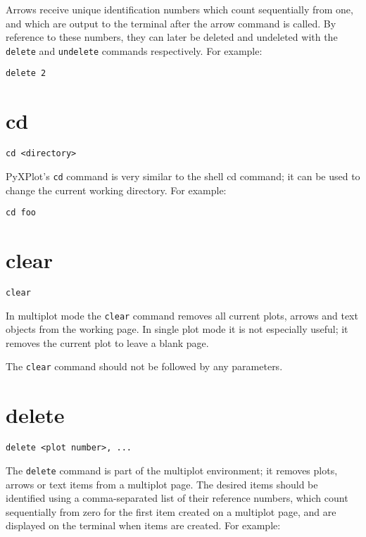 Arrows receive unique identification numbers which count sequentially from one,
and which are output to the terminal after the arrow command is called. By
reference to these numbers, they can later be deleted and undeleted with the
{\tt delete} and {\tt undelete} commands respectively. For example:

\begin{verbatim}
delete 2
\end{verbatim}

\section{cd}

\begin{verbatim}
cd <directory>
\end{verbatim}

PyXPlot's {\tt cd} command is very similar to the shell cd command; it can be used to
change the current working directory. For example:

\begin{verbatim}
cd foo
\end{verbatim}


\section{clear}

\begin{verbatim}
clear
\end{verbatim}

In multiplot mode the {\tt clear} command removes all current plots, arrows and
text objects from the working page. In single plot mode it is not especially
useful; it removes the current plot to leave a blank page.

The {\tt clear} command should not be followed by any parameters.


\section{delete}

\begin{verbatim}
delete <plot number>, ...
\end{verbatim}

The {\tt delete} command is part of the multiplot environment; it removes
plots, arrows or text items from a multiplot page. The desired items should be
identified using a comma-separated list of their reference numbers, which count
sequentially from zero for the first item created on a multiplot page, and are
displayed on the terminal when items are created.  For example:

